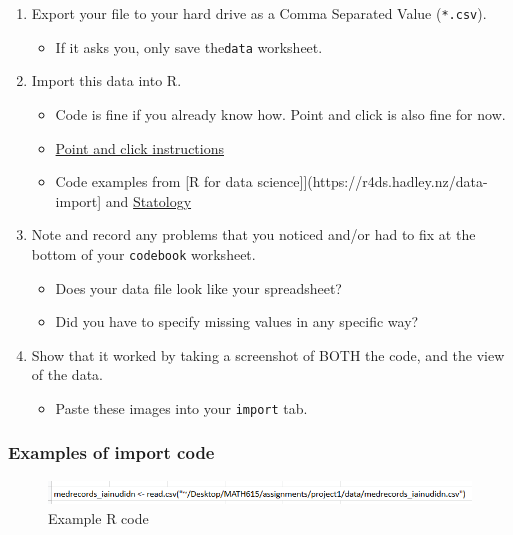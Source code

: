 \documentclass[
  letterpaper,
  DIV=11,
  numbers=noendperiod]{scrartcl}
\providecommand{\tightlist}{%
  \setlength{\itemsep}{0pt}\setlength{\parskip}{0pt}}\usepackage{longtable,booktabs,array}
\begin{document}
\begin{enumerate}
\def\labelenumi{\arabic{enumi}.}
\tightlist
\item
  Export your file to your hard drive as a Comma Separated Value
  (\texttt{*.csv}).

  \begin{itemize}
  \tightlist
  \item
    If it asks you, only save the\texttt{data} worksheet.
  \end{itemize}
\item
  Import this data into R.

  \begin{itemize}
  \tightlist
  \item
    Code is fine if you already know how. Point and click is also fine
    for now.
  \item
    \href{https://support.posit.co/hc/en-us/articles/218611977-Importing-Data-with-the-RStudio-IDE}{Point
    and click instructions}
  \item
    Code examples from {[}R for data
    science{]}{]}(https://r4ds.hadley.nz/data-import{]} and
    \href{https://www.statology.org/import-csv-into-r/}{Statology}
  \end{itemize}
\item
  Note and record any problems that you noticed and/or had to fix at the
  bottom of your \texttt{codebook} worksheet.

  \begin{itemize}
  \tightlist
  \item
    Does your data file look like your spreadsheet?
  \item
    Did you have to specify missing values in any specific way?
  \end{itemize}
\item
  Show that it worked by taking a screenshot of BOTH the code, and the
  view of the data.

  \begin{itemize}
  \tightlist
  \item
    Paste these images into your \texttt{import} tab.
  \end{itemize}
\end{enumerate}

\hypertarget{examples-of-import-code}{%
\subsubsection{Examples of import code}\label{examples-of-import-code}}

\begin{figure}

{\centering \includegraphics{images/hw1_r_code.png}

}

\caption{Example R code}

\end{figure}
\end{document}
